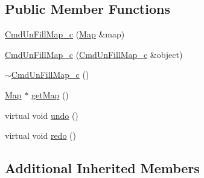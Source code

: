 \subsection*{Public Member Functions}
\begin{DoxyCompactItemize}
\item 
\hyperlink{class_cmd_un_fill_map__c_ae74ce6590cc32ae1ae3040f21785ce0f}{Cmd\+Un\+Fill\+Map\+\_\+c} (\hyperlink{class_map}{Map} \&map)
\item 
\hyperlink{class_cmd_un_fill_map__c_adf5293913ad2ddc74f0e43f706a30c8d}{Cmd\+Un\+Fill\+Map\+\_\+c} (\hyperlink{class_cmd_un_fill_map__c}{Cmd\+Un\+Fill\+Map\+\_\+c} \&object)
\item 
\hyperlink{class_cmd_un_fill_map__c_adc6823e8039f591782014b6927b2f229}{$\sim$\+Cmd\+Un\+Fill\+Map\+\_\+c} ()
\item 
\hyperlink{class_map}{Map} $\ast$ \hyperlink{class_cmd_un_fill_map__c_a4002c3452512bf4a5b7a64a2e3ba8d74}{get\+Map} ()
\item 
virtual void \hyperlink{class_cmd_un_fill_map__c_a966ef4e2f64ef0c9689328b68617c40e}{undo} ()
\item 
virtual void \hyperlink{class_cmd_un_fill_map__c_a32fb82d2400cc3b5cf911f2aec441168}{redo} ()
\end{DoxyCompactItemize}
\subsection*{Additional Inherited Members}


